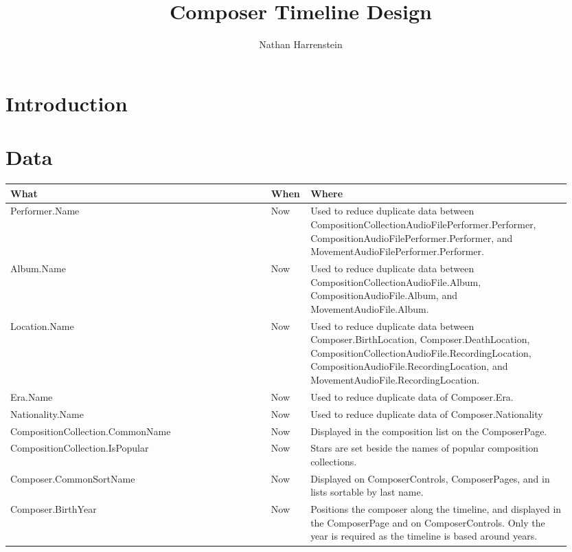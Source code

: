 \documentclass[letterpaper]{report}
\author{Nathan Harrenstein}
\title{Composer Timeline Design}
\begin{document}
\maketitle

\renewcommand{\baselinestretch}{1.25}\normalsize
\tableofcontents
\renewcommand{\baselinestretch}{1}\normalsize

\chapter{Introduction}

\chapter{Data}

\begin{longtable}{p{0.45\linewidth} p{0.05\linewidth} p{0.45\linewidth}}
What & When & Where \\ \hline
Performer.Name & Now & Used to reduce duplicate data between CompositionCollectionAudioFilePerformer.Performer, CompositionAudioFilePerformer.Performer, and MovementAudioFilePerformer.Performer. \\
Album.Name & Now & Used to reduce duplicate data between CompositionCollectionAudioFile.Album, CompositionAudioFile.Album, and MovementAudioFile.Album. \\
Location.Name & Now & Used to reduce duplicate data between Composer.BirthLocation, Composer.DeathLocation, CompositionCollectionAudioFile.RecordingLocation, CompositionAudioFile.RecordingLocation, and MovementAudioFile.RecordingLocation. \\
Era.Name & Now & Used to reduce duplicate data of Composer.Era. \\
Nationality.Name & Now & Used to reduce duplicate data of Composer.Nationality \\
CompositionCollection.CommonName & Now & Displayed in the composition list on the ComposerPage. \\
CompositionCollection.IsPopular & Now & Stars are set beside the names of popular composition collections. \\
Composer.CommonSortName & Now & Displayed on ComposerControls, ComposerPages, and in lists sortable by last name. \\
Composer.BirthYear & Now & Positions the composer along the timeline, and displayed in the ComposerPage and on ComposerControls. Only the year is required as the timeline is based around years. \\

\end{longtable}
\end{document}
